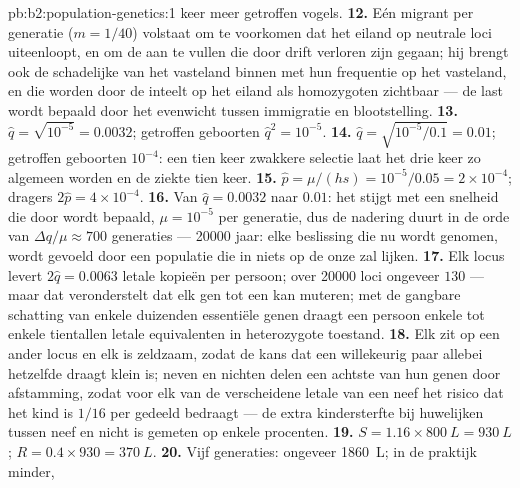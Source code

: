 \begin{solution}{pb:b2:population-genetics:1}
keer meer getroffen vogels.
\textbf{12.} Eén migrant per generatie ($m = 1/40$) volstaat om te
voorkomen dat het eiland op neutrale loci uiteenloopt, en om de 
aan te vullen die door drift verloren zijn gegaan; hij brengt ook de
schadelijke  van het vasteland binnen met hun frequentie op het
vasteland, en die worden door de inteelt op het eiland als homozygoten
zichtbaar --- de last wordt bepaald door het evenwicht tussen immigratie en
blootstelling.
\textbf{13.} $\hat q = \sqrt{10^{-5}} = 0.0032$; getroffen geboorten $\hat
q^{2} = 10^{-5}$.
\textbf{14.} $\hat q = \sqrt{10^{-5}/0.1} = 0.01$; getroffen geboorten
$10^{-4}$: een tien keer zwakkere selectie laat het  drie keer zo
algemeen worden en de ziekte tien keer.
\textbf{15.} $\hat p = \mu/(hs) = 10^{-5}/0.05 = 2\times 10^{-4}$;
dragers $2\hat p = 4\times 10^{-4}$.
\textbf{16.} Van $\hat q = 0.0032$ naar $0.01$: het  stijgt met een
snelheid die door  wordt bepaald, $\mu = 10^{-5}$ per generatie, dus de
nadering duurt in de orde van $\Delta q/\mu \approx 700$ generaties ---
\num{20000} jaar: elke beslissing die nu wordt genomen, wordt gevoeld door een
populatie die in niets op de onze zal lijken.
\textbf{17.} Elk locus levert $2\hat q = 0.0063$ letale kopieën
per persoon; over \num{20000} loci ongeveer $130$ --- maar dat veronderstelt
dat elk gen tot een   kan muteren; met de gangbare
schatting van enkele duizenden essentiële genen draagt een persoon enkele tot
enkele tientallen letale equivalenten in heterozygote toestand.
\textbf{18.} Elk zit op een ander locus en elk is zeldzaam, zodat de
kans dat een willekeurig paar allebei hetzelfde draagt klein is;
neven en nichten delen een achtste van hun genen door afstamming, zodat voor
elk van de verscheidene letale  van een neef het risico dat het kind
 is $1/16$ per gedeeld  bedraagt --- de extra
kindersterfte bij huwelijken tussen neef en nicht is gemeten op enkele procenten.
\textbf{19.} $S = 1.16\times \qty{800}{L} = \qty{930}{L}$; $R = 0.4\times
930 = \qty{370}{L}$.
\textbf{20.} Vijf generaties: ongeveer \qty{1860}{L}; in de praktijk minder,

\end{solution}
